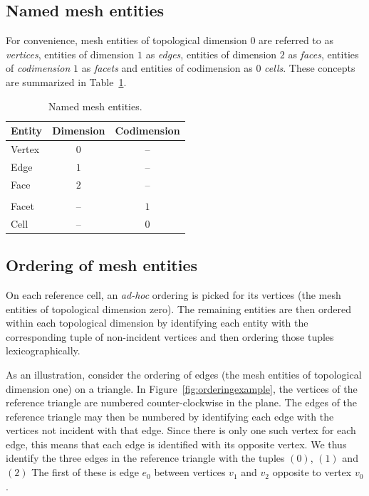 \subsection{Named mesh entities}

For convenience, mesh entities of topological dimension $0$ are
referred to as \emph{vertices}, entities of dimension $1$
as \emph{edges}, entities of dimension $2$ as \emph{faces}, entities of
\emph{codimension} $1$ as \emph{facets} and entities of codimension as
$0$ \emph{cells}. These concepts are summarized in
Table~\ref{tab:entities}.

\begin{table}[H]
  \begin{center}
    \begin{tabular}{|l|c|c|}
      \hline
      Entity & Dimension & Codimension \\
      \hline
      Vertex & $0$       & -- \\
      Edge   & $1$       & -- \\
      Face   & $2$       & -- \\
      & & \\
      Facet  & --      &  $1$ \\
      Cell   & --      &  $0$ \\
      \hline
    \end{tabular}
    \caption{Named mesh entities.}
    \label{tab:entities}
  \end{center}
\end{table}

\subsection{Ordering of mesh entities}

On each reference cell, an \emph{ad-hoc} ordering is picked for its
vertices (the mesh entities of topological dimension zero). The
remaining entities are then ordered within each topological dimension
by identifying each entity with the corresponding tuple of
non-incident vertices and then ordering those tuples
lexicographically.

As an illustration, consider the ordering of edges (the mesh entities
of topological dimension one) on a triangle. In
Figure~\ref{fig:orderingexample}, the vertices of the reference
triangle are numbered counter-clockwise in the plane. The edges of the
reference triangle may then be numbered by identifying each edge with
the vertices not incident with that edge. Since there is only one such
vertex for each edge, this means that each edge is identified with its
opposite vertex. We thus identify the three edges in the
reference triangle with the tuples $(0)$, $(1)$ and $(2)$
The first of these is edge $e_0$ between vertices $v_1$ and $v_2$
opposite to vertex $v_0$.

